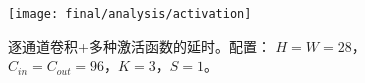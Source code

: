 \begin{figure}[htbp]
    \centering
    \texttt{[image: final/analysis/activation]}
    \caption{
        逐通道卷积+多种激活函数的延时。配置：
        $H=W=28$，$C_{in}=C_{out}=96$，$K=3$，$S=1$。
    }
    \label{fig:activation_latency}
\end{figure}